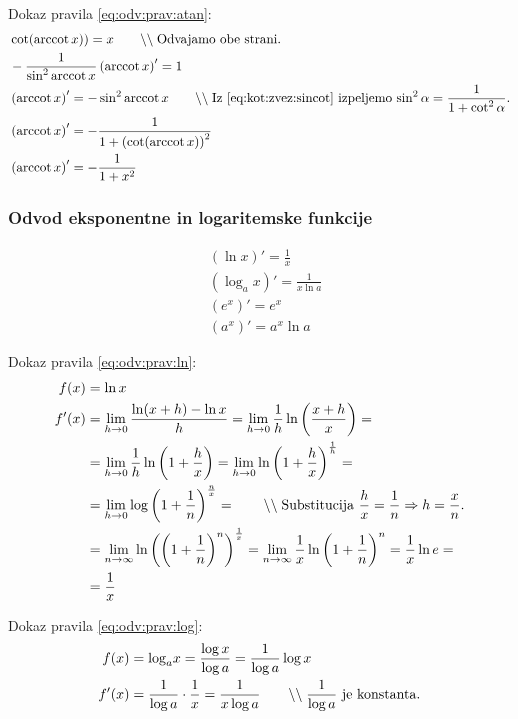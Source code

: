\documentclass[a4paper,oneside,12pt,fleqn]{article}
\newcommand\krat\cdot
\newcommand{\comment}[1]{\ensuremath{\qquad\backslash\backslash\;}\textnormal{#1}}
\newcommand{\arccot}{\ensuremath{\operatorname{arccot}}} %
\def\limi{\displaystyle\lim_{n\to\infty}} %
\def\limh{\lim_{h\rightarrow0}} %
\renewcommand\implies\Rightarrow
\numberwithin{equation}{section}
\begin{document}
Dokaz pravila \eqref{eq:odv:prav:atan}:
\begin{align*}
  & \cot(\arccot x)) = x \comment{Odvajamo obe strani.} \\
  & -\frac{1}{\sin^2\arccot x}\left( \arccot x \right)' = 1 \\
  & \left( \arccot x \right)' = -\sin^2\arccot x \comment{Iz \eqref{eq:kot:zvez:sincot}
  izpeljemo $\sin^2\alpha = \frac{1}{1 + \cot^2\alpha}$.} \\
  & \left( \arccot x \right)' = -\frac{1}{1 + \left( \cot(\arccot x) \right)^2} \\
  &  \left( \arccot x \right)' = -\frac{1}{1 + x^2}
\end{align*}

\subsubsection{Odvod eksponentne in logaritemske funkcije}
\label{sec:odv:elem:exp}

\begin{align}
  & \left( \ln x \right)' = \frac{1}{x} \label{eq:odv:prav:ln} \\
  & \left( \log_a\!x \right)' = \frac{1}{x\ln a} \label{eq:odv:prav:log} \\
  & \left( e^x \right)' = e^x \label{eq:odv:prav:ex} \\
  & \left( a^x \right)' = a^x\ln a \label{eq:odv:prav:ax}
\end{align}

Dokaz pravila \eqref{eq:odv:prav:ln}:
\begin{align*}
  f(x) &= \ln x \\
  f'(x) &= \limh\frac{\ln(x+h) - \ln x}{h} = \limh\frac{1}{h}\ln\left(\frac{x+h}{x}\right) = \\
  &= \limh\frac{1}{h}\ln\left( 1+\frac{h}{x} \right) = \limh\ln\left(
  1+\frac{h}{x}\right)^{\frac{1}{h}} = \\ &= \limh\log\left( 1+\frac{1}{n}
  \right)^{\frac{n}{x}} = \comment{Substitucija $\frac{h}{x} = \frac{1}{n} \implies h =
  \frac{x}{n}$.} \\
  &= \limi\ln\left(\left( 1+\frac{1}{n} \right)^n\right)^{\frac{1}{x}} =
  \limi\frac{1}{x}\ln\left( 1+\frac{1}{n} \right)^n = \frac{1}{x}\ln e = \\
  &= \frac{1}{x}
\end{align*}

Dokaz pravila \eqref{eq:odv:prav:log}:
\begin{align*}
  f(x) &= \log_a\!x = \frac{\log x}{\log a} = \frac{1}{\log a}\log x \\
  f'(x) &= \frac{1}{\log a} \krat \frac{1}{x} = \frac{1}{x\log a} \comment{$\frac{1}{\log
  a}$ je konstanta.}
\end{align*}
\end{document}
